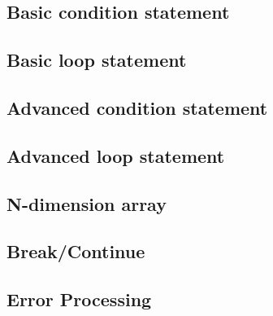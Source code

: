 \documentclass{article}
\begin{document}
		\subsection{Basic condition statement}
		\subsection{Basic loop statement}
		\subsection{Advanced condition statement}
		\subsection{Advanced loop statement}
		\subsection{N-dimension array}
		\subsection{Break/Continue}
		\subsection{Error Processing}
		
		
	
\end{document}
